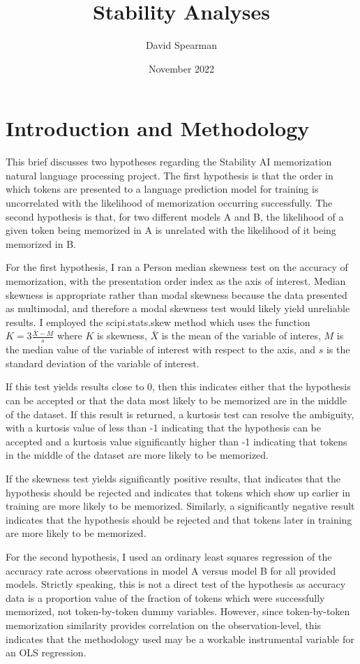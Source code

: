 \documentclass{article}
\title{Stability Analyses}
\author{David Spearman}
\date{November 2022}
\begin{document}
\maketitle

\section{Introduction and Methodology}

This brief discusses two hypotheses regarding the Stability AI memorization natural language processing project. The first hypothesis is that the order in which tokens are presented to a language prediction model for training is uncorrelated with the likelihood of memorization occurring successfully. The second hypothesis is that, for two different models A and B, the likelihood of a given token being memorized in A is unrelated with the likelihood of it being memorized in B.

For the first hypothesis, I ran a Person median skewness test on the accuracy of memorization, with the presentation order index as the axis of interest. Median skewness is appropriate rather than modal skewness because the data presented as multimodal, and therefore a modal skewness test would likely yield unreliable results. I employed the scipi.stats.skew method which uses the function $K=3\frac{\bar{X}-M}{s}$ where $K$ is skewness, $\bar{X}$ is the mean of the variable of interes, $M$ is the median value of the variable of interest with respect to the axis, and $s$ is the standard deviation of the variable of interest.

If this test yields results close to 0, then this indicates either that the hypothesis can be accepted or that the data most likely to be memorized are in the middle of the dataset. If this result is returned, a kurtosis test can resolve the ambiguity, with a kurtosis value of less than -1 indicating that the hypothesis can be accepted and a kurtosis value significantly higher than -1 indicating that tokens in the middle of the dataset are more likely to be memorized.

If the skewness test yields significantly positive results, that indicates that the hypothesis should be rejected and indicates that tokens which show up earlier in training are more likely to be memorized. Similarly, a significantly negative result indicates that the hypothesis should be rejected and that tokens later in training are more likely to be memorized.

For the second hypothesis, I used an ordinary least squares regression of the accuracy rate across observations in model A versus model B for all provided models. Strictly speaking, this is not a direct test of the hypothesis as accuracy data is a proportion value of the fraction of tokens which were successfully memorized, not token-by-token dummy variables. However, since token-by-token memorization similarity provides correlation on the observation-level, this indicates that the methodology used may be a workable instrumental variable for an OLS regression. 
\end{document}
